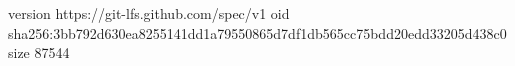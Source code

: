 version https://git-lfs.github.com/spec/v1
oid sha256:3bb792d630ea8255141dd1a79550865d7df1db565cc75bdd20edd33205d438c0
size 87544
